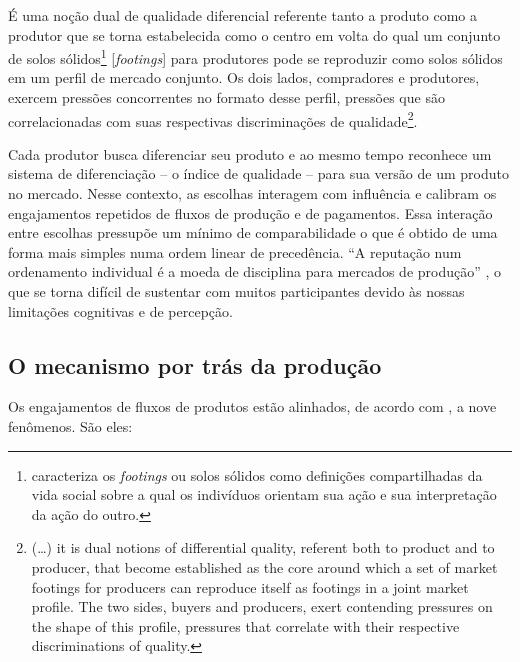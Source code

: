 \documentclass[a4paper, 12pt, openright, oneside, german, french, english, brazil]{abntex2}
\begin{document}
	\begin{citacao}
		É uma noção dual de qualidade diferencial referente tanto a produto como a produtor que se torna estabelecida como o centro em volta do qual um conjunto de solos sólidos\footnote{ caracteriza os \textit{footings} ou solos sólidos como definições compartilhadas da vida social sobre a qual os indivíduos orientam sua ação e sua interpretação da ação do outro.} [\textit{footings}] para produtores pode se reproduzir como solos sólidos em um perfil de mercado conjunto. Os dois lados, compradores e produtores, exercem pressões concorrentes no formato desse perfil, pressões que são correlacionadas com suas respectivas discriminações de qualidade\footnote{(\dots) it is dual notions of differential quality, referent both to product and to producer, that become established as the core around which a set of market footings for producers can reproduce itself as footings in a joint market profile. The two sides, buyers and producers, exert contending pressures on the shape of this profile, pressures that correlate with their respective discriminations of quality.}. \cite[p. 10]{white2002markets}
	\end{citacao}
	
	Cada produtor busca diferenciar seu produto e ao mesmo tempo reconhece um sistema de diferenciação  -- o índice de qualidade -- para sua versão de um produto no mercado. Nesse contexto, as escolhas interagem com influência e calibram os engajamentos repetidos de fluxos de produção e de pagamentos. Essa interação entre escolhas pressupõe um mínimo de comparabilidade o que é obtido de uma forma mais simples numa ordem linear de precedência. ``A reputação num ordenamento individual é a moeda de disciplina para mercados de produção'' \cite[p. 10]{white2002markets}, o que se torna difícil de sustentar com muitos participantes devido às nossas limitações cognitivas e de percepção. 
	
	
	\subsection{O mecanismo por trás da produção}
	
	Os engajamentos de fluxos de produtos estão alinhados, de acordo com , a nove fenômenos. São eles:
	
\end{document}
